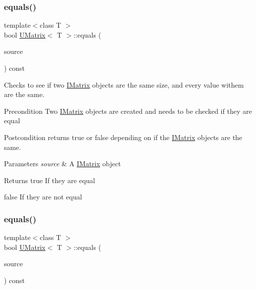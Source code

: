 \subsubsection{\texorpdfstring{equals()}{equals()}\hspace{0.1cm}{\footnotesize\ttfamily [2/6]}}
{\footnotesize\ttfamily template$<$class T $>$ \\
bool \mbox{\hyperlink{class_u_matrix}{U\+Matrix}}$<$ T $>$\+::equals (\begin{DoxyParamCaption}\item[{const \mbox{\hyperlink{class_i_matrix}{I\+Matrix}}$<$ \mbox{\hyperlink{class_t_matrix}{T\+Matrix}}$<$ T $>$, T $>$ \&}]{source }\end{DoxyParamCaption}) const}



Checks to see if two \mbox{\hyperlink{class_i_matrix}{I\+Matrix}} objects are the same size, and every value withem are the same. 

\begin{DoxyPrecond}{Precondition}
Two \mbox{\hyperlink{class_i_matrix}{I\+Matrix}} objects are created and needs to be checked if they are equal 
\end{DoxyPrecond}
\begin{DoxyPostcond}{Postcondition}
returns true or false depending on if the \mbox{\hyperlink{class_i_matrix}{I\+Matrix}} objects are the same.
\end{DoxyPostcond}

\begin{DoxyParams}{Parameters}
{\em source} & A \mbox{\hyperlink{class_i_matrix}{I\+Matrix}} object \\
\hline
\end{DoxyParams}
\begin{DoxyReturn}{Returns}
true If they are equal 

false If they are not equal 
\end{DoxyReturn}
\mbox{\label{class_u_matrix_a68c4d5b9cf92b329657205a635294bab}} 
\subsubsection{\texorpdfstring{equals()}{equals()}\hspace{0.1cm}{\footnotesize\ttfamily [3/6]}}
{\footnotesize\ttfamily template$<$class T $>$ \\
bool \mbox{\hyperlink{class_u_matrix}{U\+Matrix}}$<$ T $>$\+::equals (\begin{DoxyParamCaption}\item[{const \mbox{\hyperlink{class_i_matrix}{I\+Matrix}}$<$ \mbox{\hyperlink{class_l_matrix}{L\+Matrix}}$<$ T $>$, T $>$ \&}]{source }\end{DoxyParamCaption}) const}



